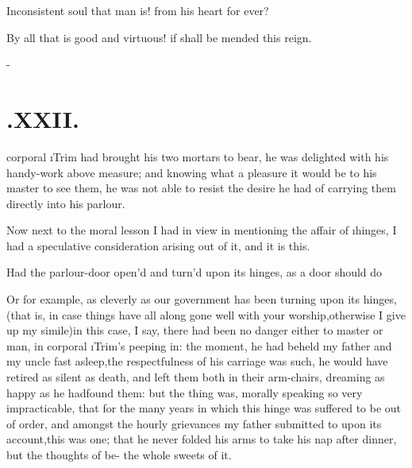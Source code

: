 \documentclass[twoside]{article}
\begin{document}
\tsh Inconsistent soul that man is!\tsk
{} 
from his heart for ever?

By all that is good and virtuous! if 
shall be mended this reign.

\null\kern-\baselineskip
\section{.\quad  XXII.}

 corporal \i{Trim} had brought
his two mortars to bear, he was delighted with his handy-work
above\break
measure; and knowing what a pleasure it would be to his master to
see them, he was not able to resist the desire he had of carrying
them directly into his parlour.

Now next to the moral lesson I had in view in mentioning the
affair of \i{hinges}, I had a speculative consideration arising
out of it, and it is this.

Had the parlour-door open’d and\break
turn’d upon its hinges, as a door should do\tsh{}

\tsk Or for example, as cleverly as our government has been
turning upon its hinges,\tsh (that is, in case things have all
along gone well with your worship,\tsk otherwise I give up my
simile)\tsk in this case, I say, there had been no danger either
to master or man, in corporal \i{Trim}’s peeping in: the
moment, he had beheld my father and my uncle \toby fast
asleep,\break\tsk the respectfulness of his carriage was such,
he would have retired as silent as death, and left them both in
their arm-chairs, dreaming as happy as he had\break found them:
but the thing was, morally speaking so very impracticable, that
for the many years in which this hinge was suffered to be out of
order, and amongst the hourly grievances my father submitted to
upon its account,\tsk this was one; that he never folded his
arms to take his nap after dinner, but the thoughts of be-
the whole sweets of it.
\end{document}
